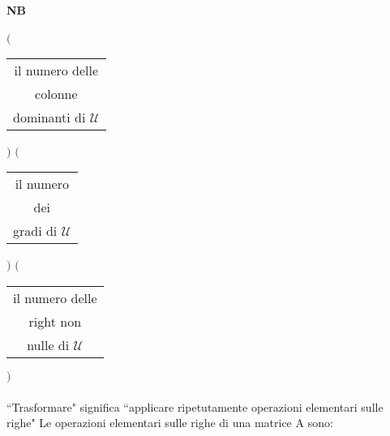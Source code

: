 \paragraph{NB} 
$\Bigg($
\begin{tabular}{c}
    il numero delle\\
    colonne\\
    dominanti di $\mathcal{U}$
\end{tabular}
$\Bigg)$
$\Bigg($
\begin{tabular}{c}
    il numero \\
    dei\\
    gradi di $\mathcal{U}$
\end{tabular}
$\Bigg)$
$\Bigg($
\begin{tabular}{c}
    il numero delle\\
    right non \\
    nulle di $\mathcal{U}$
\end{tabular}
$\Bigg)$\\\\
``Trasformare" significa ``applicare ripetutamente operazioni elementari sulle righe"
{\color{red}
    Le operazioni elementari sulle righe di una matrice A sono:
}


